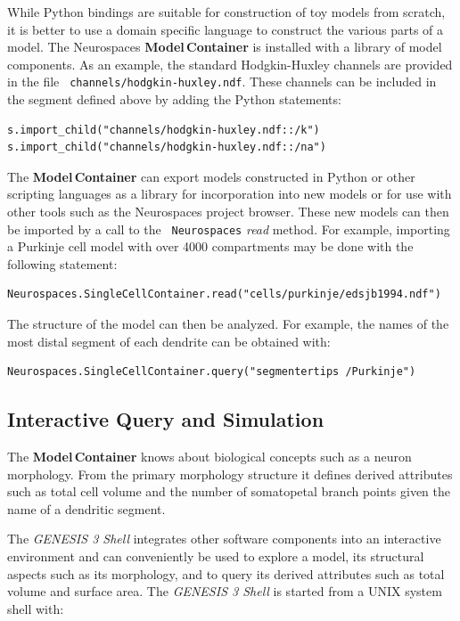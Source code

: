 \documentclass[12pt]{article}
\begin{document}
While Python bindings are suitable for construction of toy models from
scratch, it is better to use a domain specific language to construct
the various parts of a model. The Neurospaces {\bf Model\,Container} is
installed with a library of model components.  As an example, the
standard Hodgkin-Huxley channels are provided in the file {\tt
  channels/hodgkin-huxley.ndf}.  These channels can be included in the
segment defined above by adding the Python statements:

{\footnotesize
  \resetlinenumber[23]
  \linenumbers
\begin{verbatim}
s.import_child("channels/hodgkin-huxley.ndf::/k")
s.import_child("channels/hodgkin-huxley.ndf::/na")
\end{verbatim}
}

The {\bf Model\,Container} can export models constructed in Python or other
scripting languages as a library for incorporation into new models or
for use with other tools such as the Neurospaces project browser.
These new models can then be imported by a call to the {\tt
  Neurospaces} {\it read} method. For example, importing a Purkinje
cell model with over 4000 compartments may be done with the following
statement:

{\footnotesize
\begin{verbatim}
Neurospaces.SingleCellContainer.read("cells/purkinje/edsjb1994.ndf")
\end{verbatim}
}

The structure of the model can then be analyzed.  For example, the
names of the most distal segment of each dendrite can be obtained
with:

{\footnotesize
\begin{verbatim}
Neurospaces.SingleCellContainer.query("segmentertips /Purkinje")
\end{verbatim}
}


\subsection{Interactive Query and Simulation}

The {\bf Model\,Container} knows about biological concepts such as a neuron
morphology.  From the primary morphology structure it defines derived
attributes such as total cell volume and the number of somatopetal
branch points given the name of a dendritic segment.

The {\it GENESIS 3 Shell} integrates other software components into an
interactive environment and can conveniently be used to explore a
model, its structural aspects such as its morphology, and to query its
derived attributes such as total volume and surface area.  The {\it
  GENESIS 3 Shell} is started from a UNIX system shell with:
\end{document}
